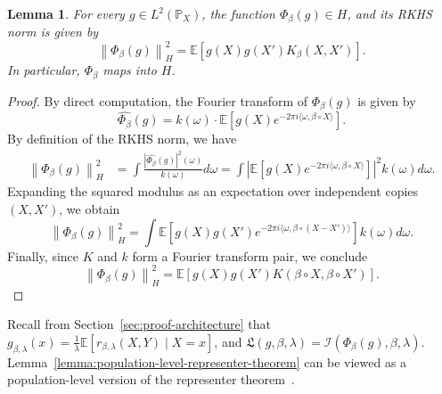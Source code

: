 \documentclass[sn-mathphys-num]{sn-jnl}%
\numberwithin{equation}{section}
\newcommand{\E}{\mathbb{E}}
\newcommand{\kernel}{K}
\newcommand{\norm}[1]{\left\|{#1}\right\|} %
\renewcommand{\P}{\mathbb{P}}
\newtheorem{lemma}{Lemma}
\theoremstyle{thmstyleone}%
\theoremstyle{thmstyletwo}%
\theoremstyle{thmstylethree}%
\begin{document}
\begin{lemma}
\label{lemma:Phi-beta-map-into-H}
For every $g\in L^2(\P_X)$, the function $\Phi_\beta (g) \in H$, and its RKHS norm is given by 
\begin{equation*}
	\norm{\Phi_\beta(g)}_H^2 = \E[g(X) g(X') \kernel_\beta(X, X')].
\end{equation*} 
In particular, $\Phi_\beta$ maps into $H$.
\end{lemma}
\begin{proof} 
By direct computation, the Fourier transform of $\Phi_\beta(g)$ is given by
\begin{equation*}
	\widehat{\Phi_\beta}(g) = k(\omega) \cdot \E[g(X) e^{-2\pi i \langle \omega, \beta \circ X\rangle}].
\end{equation*}
By definition of the RKHS norm, we have 
\begin{equation*}
\begin{split} 
	\norm{\Phi_\beta(g)}_H^2 &= \int \frac{|\widehat{\Phi_\beta}(g)|^2(\omega)}{k(\omega)} d \omega
		= \int |\E[g(X) e^{-2\pi i \langle \omega, \beta \circ X\rangle}]|^2 k(\omega) d\omega.
\end{split} 
\end{equation*}
Expanding the squared modulus as an expectation over independent copies $(X, X')$, we obtain
\begin{equation*}
	\norm{\Phi_\beta(g)}_H^2 = 
		\int \E[g(X)g(X') e^{-2\pi i \langle \omega, \beta \circ (X-X')\rangle}] k(\omega) d\omega.
\end{equation*}
Finally, since $\kernel$ and $k$ form a Fourier transform pair, we conclude
\begin{equation*}
	\norm{\Phi_\beta(g)}_H^2 =  \E[g(X) g(X')  \kernel(\beta \circ X, \beta \circ X')].
\end{equation*}
\end{proof} 

Recall from Section~\ref{sec:proof-architecture} that
$g_{\beta, \lambda}(x) = \frac{1}{\lambda} \E[r_{\beta, \lambda}(X, Y) \mid X = x]$,
and 
$\mathfrak{L}(g, \beta, \lambda) = \mathcal{I}(\Phi_\beta(g), \beta, \lambda)$. 
Lemma~\ref{lemma:population-level-representer-theorem} can be viewed as a population-level version of 
the representer theorem~\cite{Bach24}. %
\end{document}
